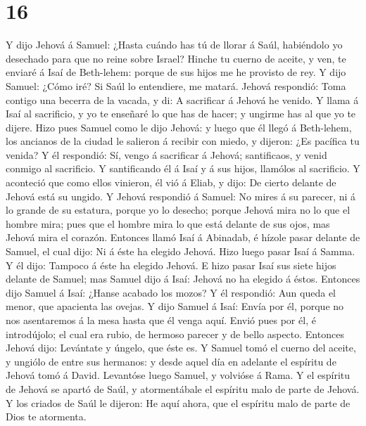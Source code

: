 \hypertarget{section-15}{%
\section{16}\label{section-15}}

 Y dijo Jehová á Samuel: ¿Hasta cuándo has tú de llorar á
Saúl, habiéndolo yo desechado para que no reine sobre Israel? Hinche tu
cuerno de aceite, y ven, te enviaré á Isaí de Beth-lehem: porque de sus
hijos me he provisto de rey.  Y dijo Samuel: ¿Cómo iré? Si
Saúl lo entendiere, me matará. Jehová respondió: Toma contigo una
becerra de la vacada, y di: A sacrificar á Jehová he venido.
 Y llama á Isaí al sacrificio, y yo te enseñaré lo que has
de hacer; y ungirme has al que yo te dijere.  Hizo pues
Samuel como le dijo Jehová: y luego que él llegó á Beth-lehem, los
ancianos de la ciudad le salieron á recibir con miedo, y dijeron: ¿Es
pacífica tu venida?  Y él respondió: Sí, vengo á sacrificar
á Jehová; santificaos, y venid conmigo al sacrificio. Y santificando él
á Isaí y á sus hijos, llamólos al sacrificio.  Y aconteció
que como ellos vinieron, él vió á Eliab, y dijo: De cierto delante de
Jehová está su ungido.  Y Jehová respondió á Samuel: No
mires á su parecer, ni á lo grande de su estatura, porque yo lo desecho;
porque Jehová mira no lo que el hombre mira; pues que el hombre mira lo
que está delante de sus ojos, mas Jehová mira el corazón. 
Entonces llamó Isaí á Abinadab, é hízole pasar delante de Samuel, el
cual dijo: Ni á éste ha elegido Jehová.  Hizo luego pasar
Isaí á Samma. Y él dijo: Tampoco á éste ha elegido Jehová. 
E hizo pasar Isaí sus siete hijos delante de Samuel; mas Samuel dijo á
Isaí: Jehová no ha elegido á éstos.  Entonces dijo Samuel á
Isaí: ¿Hanse acabado los mozos? Y él respondió: Aun queda el menor, que
apacienta las ovejas. Y dijo Samuel á Isaí: Envía por él, porque no nos
asentaremos á la mesa hasta que él venga aquí.  Envió pues
por él, é introdújolo; el cual era rubio, de hermoso parecer y de bello
aspecto. Entonces Jehová dijo: Levántate y úngelo, que éste es.
 Y Samuel tomó el cuerno del aceite, y ungiólo de entre sus
hermanos: y desde aquel día en adelante el espíritu de Jehová tomó á
David. Levantóse luego Samuel, y volvióse á Rama.  Y el
espíritu de Jehová se apartó de Saúl, y atormentábale el espíritu malo
de parte de Jehová.  Y los criados de Saúl le dijeron: He
aquí ahora, que el espíritu malo de parte de Dios te atormenta.
